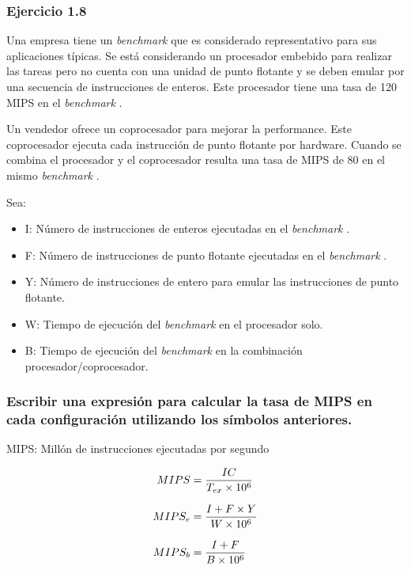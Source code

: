 \documentclass{beamer}
\newcommand{\BMRK}{\textit{benchmark }}
\begin{document}
\beamertemplatenavigationsymbolsempty
\begin{frame}
\frametitle{Ejercicio 1.8}

\begin{footnotesize}
Una empresa tiene un \BMRK que es considerado representativo para sus aplicaciones típicas. 
Se está considerando un procesador embebido para realizar las tareas pero no cuenta con una unidad de punto flotante y 
se deben emular por una secuencia de instrucciones de enteros. Este procesador tiene una tasa de 120 MIPS en el \BMRK.

Un vendedor ofrece un coprocesador para mejorar la performance. Este coprocesador ejecuta cada instrucción de punto 
flotante por hardware. Cuando se combina el procesador y el coprocesador resulta una tasa de MIPS de 80 en el mismo \BMRK.

Sea:
\begin{itemize}
 \item I: Número de instrucciones de enteros ejecutadas en el \BMRK.
 \item F: Número de instrucciones de punto flotante ejecutadas en el \BMRK.
 \item Y: Número de instrucciones de entero para emular las instrucciones de punto flotante.
 \item W: Tiempo de ejecución del \BMRK en el procesador solo.
 \item B: Tiempo de ejecución del \BMRK en la combinación procesador/coprocesador.
\end{itemize}
\end{footnotesize}
\end{frame}

\begin{frame}
\frametitle{ 
Escribir una expresión para calcular la tasa de MIPS en cada configuración utilizando los símbolos anteriores.
}

MIPS: Millón  de instrucciones ejecutadas por segundo

\begin{equation}\label{eqA}
\setlength{\jot}{10pt}
\begin{split}
MIPS &= \frac{IC}{T_{ex} \times 10^{6}} \\
MIPS_{e} &= \frac{I + F \times Y}{W \times 10^6} \\
MIPS_{b} &= \frac{I + F}{B \times 10^6}
\end{split}
\end{equation}
\end{frame}
\end{document}
